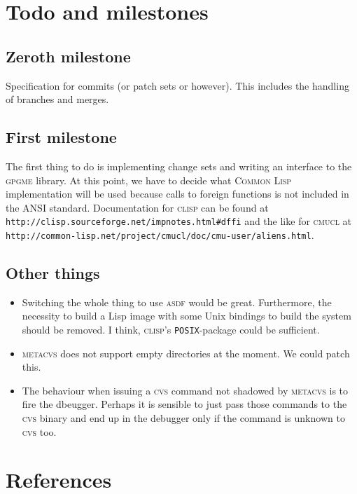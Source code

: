 \documentclass[fleqn, 10pt, a4paper]{article}
\begin{document}
\section{Todo and milestones}

\subsection{Zeroth milestone}
Specification for commits (or patch sets or however). This includes
the handling of branches and merges.

\subsection{First milestone}
The first thing to do is implementing change sets and writing an
interface to the \textsc{gpgme} library. At this point, we have to decide
what \textsc{Common Lisp} implementation will be used because calls
to foreign functions is not included in the ANSI standard.
Documentation for \textsc{clisp} can be found at
\texttt{http://clisp.sourceforge.net/impnotes.html\#dffi} and the like
for \textsc{cmucl} at \texttt{http://common-lisp.net/project/cmucl/doc/cmu-user/aliens.html}.

\subsection{Other things}
\begin{itemize}
\item Switching the whole thing to use \textsc{asdf} would be great.
Furthermore, the necessity to build a Lisp image with some Unix bindings
to build the system should be removed. I think, \textsc{clisp}'s
\texttt{POSIX}-package could be sufficient.
\item \textsc{metacvs} does not support empty directories at the moment.
We could patch this.
\item The behaviour when issuing a \textsc{cvs} command not shadowed by
\textsc{metacvs} is to fire the dbeugger. Perhaps it is sensible to
just pass those commands to the \textsc{cvs} binary and end up in the debugger
only if the command is unknown to \textsc{cvs} too.
\end{itemize}

\section{References}
\end{document}
